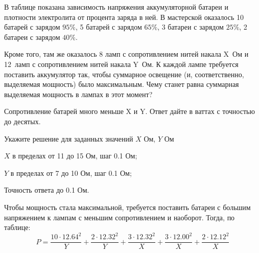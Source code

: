 
В таблице показана зависимость напряжения
аккумуляторной батареи и плотности электролита от процента заряда в ней. В мастерской
оказалось 10 батарей с зарядом $95 \%$, 5 батарей с зарядом $65 \%$, 3 батареи с
зарядом $25 \%$, 2 батареи \linebreak с зарядом $40 \%$.

Кроме
того, там же оказалось 8 ламп с сопротивлением нитей накала X~Ом и 12~ламп с
сопротивлением нитей накала Y~Ом. К каждой лампе требуется
поставить аккумулятор так, чтобы суммарное освещение (и, соответственно,
выделяемая мощность) было максимальным. Чему станет равна суммарная выделяемая
мощность в лампах в этот момент? 

Сопротивление батарей много меньше X и Y. Ответ дайте в ваттах с точностью до десятых.

Укажите решение для заданных значений $X$ Ом, $Y$ Ом

\paramSection

$X$ в пределах от 11 до 15 Ом, шаг 0.1 Ом; 

$Y$ в пределах от 7 до 10 Ом, шаг 0.1 Ом; 

Точность ответа до 0.1 Ом.

\solutionSection

Чтобы мощность стала максимальной, требуется поставить батареи с большим напряжением к 
лампам с меньшим сопротивлением и наоборот. Тогда, по таблице:
$$P=\frac{10 \cdot 12.64^2}{Y} + \frac{2 \cdot 12.32^2}{Y}+\frac{3 \cdot 12.32^2}{X}+\frac{3 \cdot 12.00^2}{X}+\frac{2 \cdot 12.12^2}{X}$$

